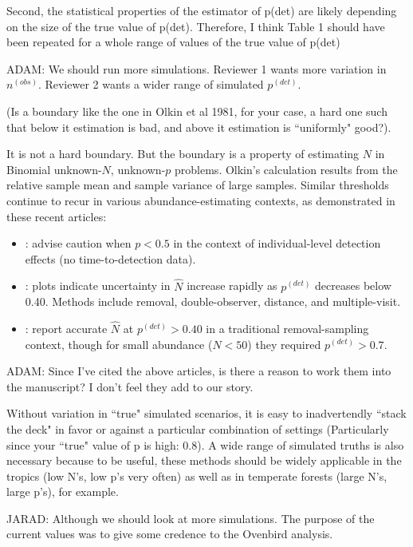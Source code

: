 \documentclass[12pt]{article}
\renewenvironment{quote}  %
              {\list{}{\rightmargin\leftmargin}\normalfont%
               \item\relax}
              {\endlist}
\newcommand{\adam}[1]{{\color{blue} ADAM: #1}}
\newcommand{\jarad}[1]{{\color{Orange} JARAD: #1}}
\newcommand{\pdet}{p^{(det)}}
\begin{document}
Second, the statistical properties of the estimator of p(det) are likely depending on the size of the true value of p(det). Therefore, I think Table 1 should have been repeated for a whole range of values of the true value of p(det)
\begin{quote}
\adam{We should run more simulations.  Reviewer 1 wants more variation in $n^{(obs)}$.  Reviewer 2 wants a wider range of simulated $\pdet$.}
\end{quote}

(Is a boundary like the one in Olkin et al 1981, for your case, a hard one such that below it estimation is bad, and above it estimation is ``uniformly" good?).
\begin{quote}
It is not a hard boundary.  
But the boundary is a property of estimating $N$ in Binomial unknown-$N$, unknown-$p$ problems.
Olkin's calculation results from the relative sample mean and sample variance of large samples.  
Similar thresholds continue to recur in various abundance-estimating contexts, as demonstrated in these recent articles: 
\begin{itemize}
\item \citet{Veech2016}: advise caution when $p<0.5$ in the context of individual-level detection effects (no time-to-detection data). 
\item \citet{Field2016}: plots indicate uncertainty in $\hat{N}$ increase rapidly as $\pdet$ decreases below 0.40.  Methods include removal, double-observer, distance, and multiple-visit.
\item \citet{Davis2016}: report accurate $\hat{N}$ at $\pdet >0.40$ in a traditional removal-sampling context, though for small abundance ($N<50$) they required $\pdet > 0.7$.
\end{itemize}
\adam{Since I've cited the above articles, is there a reason to work them into the manuscript?  I don't feel they add to our story.}
\end{quote}

 Without variation in ``true" simulated scenarios, it is easy to inadvertendly ``stack the deck" in favor or against a particular combination of settings (Particularly since your ``true" value of p is high: 0.8). A wide range of simulated truths is also necessary because to be useful, these methods should be widely applicable in the
tropics (low N's, low p's very often) as well as in temperate forests (large N's, large p's), for example.

\jarad{Although we should look at more simulations. The purpose of the current values
was to give some credence to the Ovenbird analysis.}
\end{document}
